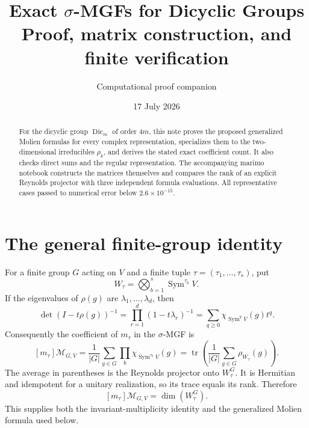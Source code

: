 \documentclass[11pt]{article}
\title{\color{navy}\textbf{Exact $\sigma$-MGFs for Dicyclic Groups}\\[2mm]
\large Proof, matrix construction, and finite verification}
\author{Computational proof companion}
\date{17 July 2026}
\newcommand{\Dic}{\operatorname{Dic}}
\newcommand{\Sym}{\operatorname{Sym}}
\newcommand{\M}{\mathcal M}
\begin{document}
\maketitle

\begin{abstract}
For the dicyclic group $\Dic_m$ of order $4m$, this note proves the proposed
generalized Molien formulas for every complex representation, specializes them
to the two-dimensional irreducibles $\rho_k$, and derives the stated exact
coefficient count.  It also checks direct sums and the regular representation.
The accompanying marimo notebook constructs the matrices themselves and
compares the rank of an explicit Reynolds projector with three independent
formula evaluations.  All representative cases passed to numerical error below
$2.6\times10^{-15}$.
\end{abstract}

\section{The general finite-group identity}
For a finite group $G$ acting on $V$ and a finite tuple
$\tau=(\tau_1,\ldots,\tau_s)$, put
\[
 W_\tau=\bigotimes_{b=1}^s\Sym^{\tau_b}V.
\]
If the eigenvalues of $\rho(g)$ are $\lambda_1,\ldots,\lambda_d$, then
\[
 \det(I-t\rho(g))^{-1}=\prod_{r=1}^d(1-t\lambda_r)^{-1}
 =\sum_{q\ge0}\chi_{\Sym^qV}(g)t^q.
\]
Consequently the coefficient of $m_\tau$ in the $\sigma$-MGF is
\[
 [m_\tau]\M_{G,V}
 =\frac1{|G|}\sum_{g\in G}\prod_b\chi_{\Sym^{\tau_b}V}(g)
 =\operatorname{tr}\!\left(\frac1{|G|}\sum_{g\in G}\rho_{W_\tau}(g)\right).
\]
The average in parentheses is the Reynolds projector onto $W_\tau^G$.
It is Hermitian and idempotent for a unitary realization, so its trace equals
its rank.  Therefore
\[
 \boxed{[m_\tau]\M_{G,V}=\dim(W_\tau^G).}
\]
This supplies both the invariant-multiplicity identity and the generalized
Molien formula used below.
\end{document}
